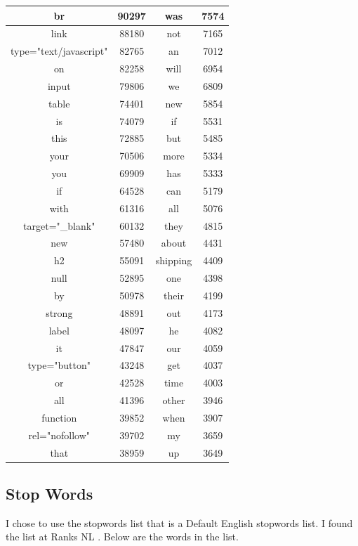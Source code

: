 \documentclass[12pt]{article}
\begin{document}
\begin{longtable}{|c|c|c|c|}
    \hline
    br & 90297 & was & 7574 \\
    \hline
    link & 88180 & not & 7165 \\
    \hline
    type="text/javascript" & 82765 & an & 7012 \\
    \hline
    on & 82258 & will & 6954 \\
    \hline
    input & 79806 & we & 6809 \\
    \hline
    table & 74401 & new & 5854 \\
    \hline
    is & 74079 & if & 5531 \\
    \hline
    this & 72885 & but & 5485 \\
    \hline
    your & 70506 & more & 5334 \\
    \hline
    you & 69909 & has & 5333 \\
    \hline
    if & 64528 & can & 5179 \\
    \hline
    with & 61316 & all & 5076 \\
    \hline
    target="\_blank" & 60132 & they & 4815 \\
    \hline
    new & 57480 & about & 4431 \\
    \hline
    h2 & 55091 & shipping & 4409 \\
    \hline
    null & 52895 & one & 4398 \\
    \hline
    by & 50978 & their & 4199 \\
    \hline
    strong & 48891 & out & 4173 \\
    \hline
    label & 48097 & he & 4082 \\
    \hline
    it & 47847 & our & 4059 \\
    \hline
    type="button" & 43248 & get & 4037 \\
    \hline
    or & 42528 & time & 4003 \\
    \hline
    all & 41396 & other & 3946 \\
    \hline
    function & 39852 & when & 3907 \\
    \hline
    rel="nofollow" & 39702 & my & 3659 \\
    \hline
    that & 38959 & up & 3649 \\
    \hline
\end{longtable}

\subsection{Stop Words}

I chose to use the stopwords list that is a Default English stopwords list. I found the list at Ranks NL \cite{Doyle:ranksNL}.  Below are the words in the list.
\end{document}
